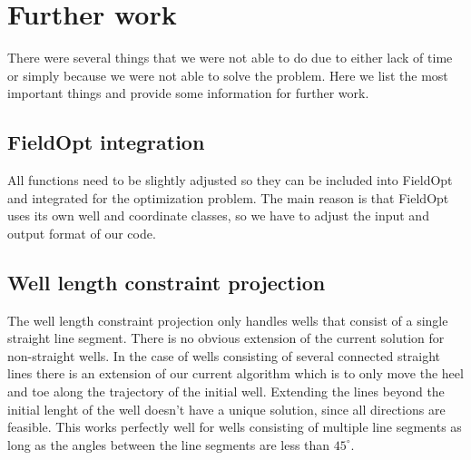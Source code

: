 \chapter{Further work}
%
There were several things that we were not able
to do due to either lack of time or simply because 
we were not able to solve the problem. Here we
list the most important things and provide some
information for further work.
%
\section{FieldOpt integration}
%
All functions need to be slightly adjusted so they
can be included into FieldOpt and integrated for
the optimization problem. The main reason is that
FieldOpt uses its own well and coordinate classes,
so we have to adjust the input and output format of
our code.
%
\section{Well length constraint projection}
%
The well length constraint projection only
handles wells that consist of a single straight line 
segment. There is no obvious extension of the 
current solution for non-straight wells. In the 
case of wells consisting of several connected 
straight lines there is an extension of our current algorithm
which is to only move the heel and toe along
the trajectory of the initial well. Extending
the lines beyond the initial lenght of the
well doesn't have a unique solution, since all
directions are feasible. This works 
perfectly well for wells consisting of multiple
line segments as long as the angles between the line 
segments are less than $45^\circ$.
%
